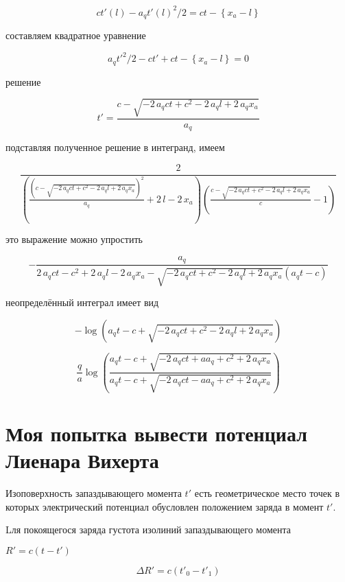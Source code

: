 \documentclass{article}
\begin{document}
$$ c t'(l) - a_q {t'(l)}^{2} / 2 = c t - \left\{x_a -  l\right\}$$

составляем квадратное уравнение

$$ a_q {t'}^{2} / 2 -c t'  + c t - \left\{x_a -  l\right\} = 0$$



решение


$$t' = \frac{c - \sqrt{-2 \, a_{q} c t + c^{2} - 2 \, a_{q} l + 2 \, a_{q} x_{a}}}{a_{q}}$$

подставляя полученное решение в интегранд, имеем

$$\frac{2}{{\left(\frac{{\left(c - \sqrt{-2 \, a_{q} c t + c^{2} - 2 \, a_{q} l + 2 \, a_{q} x_{a}}\right)}^{2}}{a_{q}} + 2 \, l - 2 \, x_{a}\right)} {\left(\frac{c - \sqrt{-2 \, a_{q} c t + c^{2} - 2 \, a_{q} l + 2 \, a_{q} x_{a}}}{c} - 1\right)}}$$

это выражение можно упростить

$$-\frac{a_{q}}{2 \, a_{q} c t - c^{2} + 2 \, a_{q} l - 2 \, a_{q} x_{a} - \sqrt{-2 \, a_{q} c t + c^{2} - 2 \, a_{q} l + 2 \, a_{q} x_{a}} {\left(a_{q} t - c\right)}}$$

неопределённый интеграл имеет вид

$$-\log\left(a_{q} t - c + \sqrt{-2 \, a_{q} c t + c^{2} - 2 \, a_{q} l + 2 \, a_{q} x_{a}}\right)$$



$$\frac{q}{a} \log\left(\frac{a_{q} t - c + \sqrt{-2 \, a_{q} c t + a a_{q} + c^{2} + 2 \, a_{q} x_{a}}}{a_{q} t - c + \sqrt{-2 \, a_{q} c t - a a_{q} + c^{2} + 2 \, a_{q} x_{a}}}\right)$$

\section{Моя попытка вывести потенциал Лиенара Вихерта}

Изоповерхность запаздывающего момента $t'$ есть геометрическое место точек в которых электрический потенциал обусловлен положением заряда в момент $t'$. 


Lля покоящегося заряда густота изолиний запаздывающего момента 

$R'=c(t-t')$

$$\Delta R' = c(t'_{0} -t'_{1})$$
\end{document}
